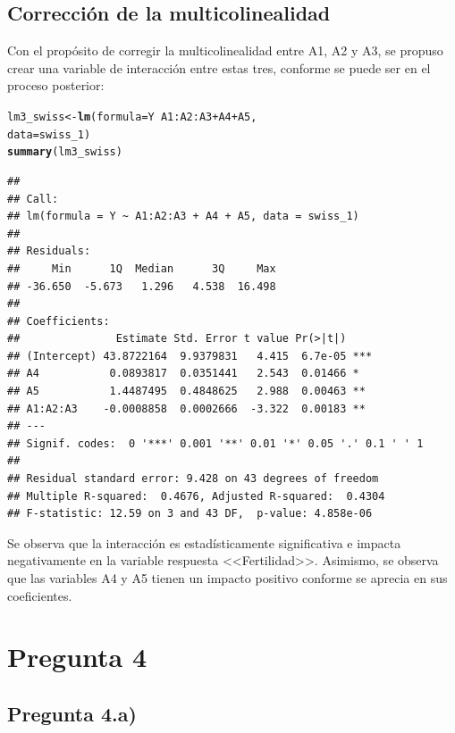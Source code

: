 \documentclass[10pt,a4paper]{article}\usepackage[]{graphicx}\usepackage[]{color}
\makeatletter
\newcommand{\hlopt}[1]{\textcolor[rgb]{0,0,0}{#1}}%
\newcommand{\hlstd}[1]{\textcolor[rgb]{0.345,0.345,0.345}{#1}}%
\newcommand{\hlkwb}[1]{\textcolor[rgb]{0.69,0.353,0.396}{#1}}%
\newcommand{\hlkwc}[1]{\textcolor[rgb]{0.333,0.667,0.333}{#1}}%
\newcommand{\hlkwd}[1]{\textcolor[rgb]{0.737,0.353,0.396}{\textbf{#1}}}%
\newenvironment{kframe}{%
 \def\at@end@of@kframe{}%
 \ifinner\ifhmode%
  \def\at@end@of@kframe{\end{minipage}}%
  \begin{minipage}{\columnwidth}%
 \fi\fi%
 \def\FrameCommand##1{\hskip\@totalleftmargin \hskip-\fboxsep
 \colorbox{shadecolor}{##1}\hskip-\fboxsep
     \hskip-\linewidth \hskip-\@totalleftmargin \hskip\columnwidth}%
 \MakeFramed {\advance\hsize-\width
   \@totalleftmargin\z@ \linewidth\hsize
   \@setminipage}}%
 {\par\unskip\endMakeFramed%
 \at@end@of@kframe}
\newenvironment{knitrout}{}{} %
\makeatother
\begin{document}
\subsection{Corrección de la multicolinealidad}

Con el propósito de corregir la multicolinealidad entre A1, A2 y A3, se propuso crear una variable de interacción entre estas tres, conforme se puede ser en el proceso posterior:

\begin{knitrout}\small
{}\color{fgcolor}\begin{kframe}
\begin{alltt}
\hlstd{lm3_swiss} \hlkwb{<-} \hlkwd{lm}\hlstd{(}\hlkwc{formula} \hlstd{= Y} \hlopt{~} \hlstd{A1}\hlopt{:}\hlstd{A2}\hlopt{:}\hlstd{A3}\hlopt{+}\hlstd{A4}\hlopt{+}\hlstd{A5,}
\hlkwc{data}\hlstd{=swiss_1)}
\hlkwd{summary}\hlstd{(lm3_swiss)}
\end{alltt}
\begin{verbatim}
## 
## Call:
## lm(formula = Y ~ A1:A2:A3 + A4 + A5, data = swiss_1)
## 
## Residuals:
##     Min      1Q  Median      3Q     Max 
## -36.650  -5.673   1.296   4.538  16.498 
## 
## Coefficients:
##               Estimate Std. Error t value Pr(>|t|)    
## (Intercept) 43.8722164  9.9379831   4.415  6.7e-05 ***
## A4           0.0893817  0.0351441   2.543  0.01466 *  
## A5           1.4487495  0.4848625   2.988  0.00463 ** 
## A1:A2:A3    -0.0008858  0.0002666  -3.322  0.00183 ** 
## ---
## Signif. codes:  0 '***' 0.001 '**' 0.01 '*' 0.05 '.' 0.1 ' ' 1
## 
## Residual standard error: 9.428 on 43 degrees of freedom
## Multiple R-squared:  0.4676,	Adjusted R-squared:  0.4304 
## F-statistic: 12.59 on 3 and 43 DF,  p-value: 4.858e-06
\end{verbatim}
\end{kframe}
\end{knitrout}

Se observa que la interacción es estadísticamente significativa	e impacta negativamente en la variable respuesta <<Fertilidad>>. Asimismo, se observa que las variables A4 y A5 tienen un impacto positivo conforme se aprecia en sus coeficientes.
\section{Pregunta 4}

\subsection{Pregunta 4.a)}
\end{document}
